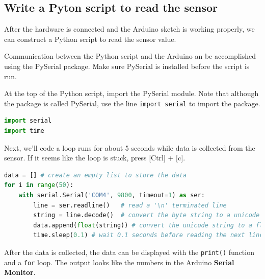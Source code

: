 \documentclass{book}
\begin{document}
    
        \subsection{Write a Pyton script to read the
sensor}\label{write-a-pyton-script-to-read-the-sensor}
    




    
        After the hardware is connected and the Arduino sketch is working
properly, we can construct a Python script to read the sensor value.

Communication between the Python script and the Arduino an be
accomplished using the PySerial package. Make sure PySerial is installed
before the script is run.

At the top of the Python script, import the PySerial module. Note that
although the package is called PySerial, use the line
\lstinline!import serial! to import the package.
    




    
        \begin{lstlisting}[language=Python]
import serial
import time
\end{lstlisting}
    




    
        Next, we'll code a loop runs for about 5 seconds while data is collected
from the sensor. If it seems like the loop is stuck, press {[}Ctrl{]} +
{[}c{]}.
    




    
        \begin{lstlisting}[language=Python]
data = [] # create an empty list to store the data
for i in range(50):
    with serial.Serial('COM4', 9800, timeout=1) as ser:
        line = ser.readline()   # read a '\n' terminated line
        string = line.decode()  # convert the byte string to a unicode string
        data.append(float(string)) # convert the unicode string to a float and add to the data list
        time.sleep(0.1) # wait 0.1 seconds before reading the next line
\end{lstlisting}
    




    
        After the data is collected, the data can be displayed with the
\lstinline!print()! function and a \lstinline!for! loop. The output
looks like the numbers in the Arduino \textbf{Serial Monitor}.
    
\end{document}
